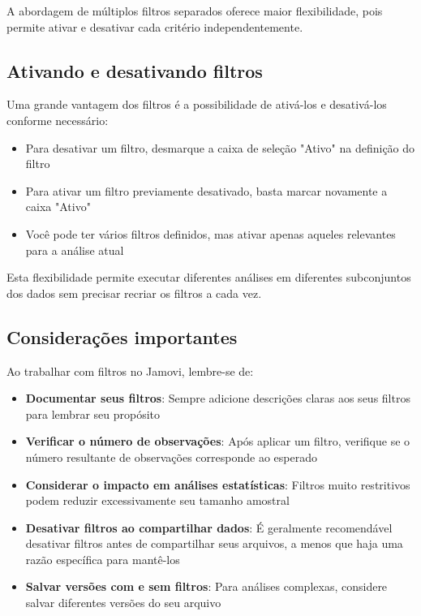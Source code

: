 A abordagem de múltiplos filtros separados oferece maior flexibilidade, pois permite ativar e desativar cada critério independentemente.


\subsection{Ativando e desativando filtros}

Uma grande vantagem dos filtros é a possibilidade de ativá-los e desativá-los conforme necessário:

\begin{itemize}
    \item Para desativar um filtro, desmarque a caixa de seleção "Ativo" na definição do filtro
    \item Para ativar um filtro previamente desativado, basta marcar novamente a caixa "Ativo"
    \item Você pode ter vários filtros definidos, mas ativar apenas aqueles relevantes para a análise atual
\end{itemize}

Esta flexibilidade permite executar diferentes análises em diferentes subconjuntos dos dados sem precisar recriar os filtros a cada vez.

\subsection{Considerações importantes}

Ao trabalhar com filtros no Jamovi, lembre-se de:

\begin{itemize}
    \item \textbf{Documentar seus filtros}: Sempre adicione descrições claras aos seus filtros para lembrar seu propósito
    \item \textbf{Verificar o número de observações}: Após aplicar um filtro, verifique se o número resultante de observações corresponde ao esperado
    \item \textbf{Considerar o impacto em análises estatísticas}: Filtros muito restritivos podem reduzir excessivamente seu tamanho amostral
    \item \textbf{Desativar filtros ao compartilhar dados}: É geralmente recomendável desativar filtros antes de compartilhar seus arquivos, a menos que haja uma razão específica para mantê-los
    \item \textbf{Salvar versões com e sem filtros}: Para análises complexas, considere salvar diferentes versões do seu arquivo
\end{itemize}


